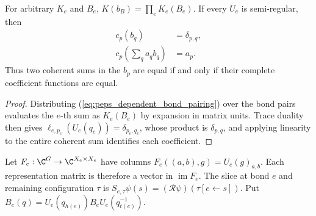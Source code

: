 \begin{lemma}%
    \label{thm:peps_dependent_coefficient_extraction}
    \leanok
    For arbitrary $K_e$ and $B_e$, $K(b_B)=\prod_eK_e(B_e)$.
    If every $U_e$ is semi-regular, then
    \begin{align}
        c_p(b_q)                      & =\delta_{p,q},
        \label{eq:peps_dependent_coefficient_delta}    \\
        c_p\left(\sum_q a_qb_q\right) & =a_p.\nonumber
    \end{align}
    Thus two coherent sums in the $b_p$ are equal if and only if their
    complete coefficient functions are equal.
\end{lemma}
\begin{proof}\leanok
    Distributing (\ref{eq:peps_dependent_bond_pairing}) over the bond pairs
    evaluates the $e$-th sum as $K_e(B_e)$ by expansion in matrix units.
    Trace duality then gives $\ell_{e,p_e}(U_e(q_e))=\delta_{p_e,q_e}$,
    whose product is $\delta_{p,q}$, and applying linearity to the entire
    coherent sum identifies each coefficient.
\end{proof}

\begin{definition}%
    \label{def:peps_dependent_bond_slice}
    \leanok
    Let $F_e:\C^G\to\C^{X_e\times X_e}$ have columns
    $F_e((a,b),g)=U_e(g)_{a,b}$. Each representation matrix is therefore
    a vector in $\operatorname{im}F_e$.
    The slice at bond $e$ and remaining configuration $\tau$ is
    $S_{e,\tau}\psi(s)=(\mathcal R\psi)(\tau[e\leftarrow s])$.
    Put $B_e(q)=U_e(q_{h(e)})B_eU_e(q_{t(e)}^{-1})$.
\end{definition}

